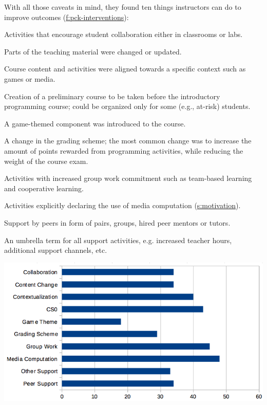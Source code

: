 With all those caveats in mind, they found ten things instructors can do
to improve outcomes (\protect\hyperlink{FIGURE}{f:pck-interventions}):

\begin{description}
\tightlist
\item[Collaboration:]
Activities that encourage student collaboration either in classrooms
or labs.
\item[Content Change:]
Parts of the teaching material were changed or updated.
\item[Contextualization:]
Course content and activities were aligned towards a specific
context such as games or media.
\item[CS0:]
Creation of a preliminary course to be taken before the introductory
programming course; could be organized only for some (e.g., at-risk)
students.
\item[Game Theme:]
A game-themed component was introduced to the course.
\item[Grading Scheme:]
A change in the grading scheme; the most common change was to
increase the amount of points rewarded from programming activities,
while reducing the weight of the course exam.
\item[Group Work:]
Activities with increased group work commitment such as team-based
learning and cooperative learning.
\item[Media Computation:]
Activities explicitly declaring the use of media computation
(\protect\hyperlink{CHAPTER}{s:motivation}).
\item[Peer Support:]
Support by peers in form of pairs, groups, hired peer mentors or
tutors.
\item[Other Support:]
An umbrella term for all support activities, e.g. increased teacher
hours, additional support channels, etc.
\end{description}

\includegraphics{../../files/interventions.png}

